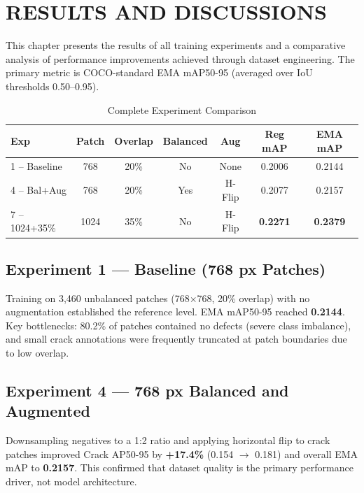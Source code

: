 \chapter{RESULTS AND DISCUSSIONS}

\justify

This chapter presents the results of all training experiments and a comparative analysis of performance improvements achieved through dataset engineering. The primary metric is COCO-standard EMA mAP50-95 (averaged over IoU thresholds 0.50--0.95).

\begin{table}[H]
\centering
\caption{Complete Experiment Comparison}
\begin{tabular}{lcccccc}
\toprule
\rowcolor{tableHeader}
{\color{white}\bfseries Exp} &
{\color{white}\bfseries Patch} &
{\color{white}\bfseries Overlap} &
{\color{white}\bfseries Balanced} &
{\color{white}\bfseries Aug} &
{\color{white}\bfseries Reg mAP} &
{\color{white}\bfseries EMA mAP} \\
\midrule
1 -- Baseline  & 768  & 20\% & No  & None   & 0.2006 & 0.2144 \\
\rowcolor{tableRowAlt}
4 -- Bal+Aug   & 768  & 20\% & Yes & H-Flip & 0.2077 & 0.2157 \\
7 -- 1024+35\% & 1024 & 35\% & No  & H-Flip & \textbf{0.2271} & \textbf{0.2379} \\
\bottomrule
\end{tabular}
\end{table}

\section*{Experiment 1 --- Baseline (768 px Patches)}

Training on 3,460 unbalanced patches (768$\times$768, 20\% overlap) with no augmentation established the reference level. EMA mAP50-95 reached \textbf{0.2144}. Key bottlenecks: 80.2\% of patches contained no defects (severe class imbalance), and small crack annotations were frequently truncated at patch boundaries due to low overlap.

\section*{Experiment 4 --- 768 px Balanced and Augmented}

Downsampling negatives to a 1:2 ratio and applying horizontal flip to crack patches improved Crack AP50-95 by \textbf{+17.4\%} (0.154 $\to$ 0.181) and overall EMA mAP to \textbf{0.2157}. This confirmed that dataset quality is the primary performance driver, not model architecture.

